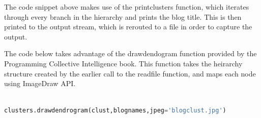 \documentclass[11pt]{scrartcl} %
\begin{document}
\tabto{2.0cm} The code snippet above makes use of the printclusters function, which iterates through every branch in the hierarchy and prints the blog title. This is then printed to the output stream, which is rerouted to a file in order to capture the output.


\tabto{2.0cm} The code below takes advantage of the drawdendogram function provided by the Programming Collective Intelligence book. This function takes the heirarchy structure created by the earlier call to the readfile function, and maps each node using ImageDraw API.

\begin{lstlisting}[language = Python, caption=ASCII File Generation]

clusters.drawdendrogram(clust,blognames,jpeg='blogclust.jpg') 

\end{lstlisting} \bigskip 
\end{document}
